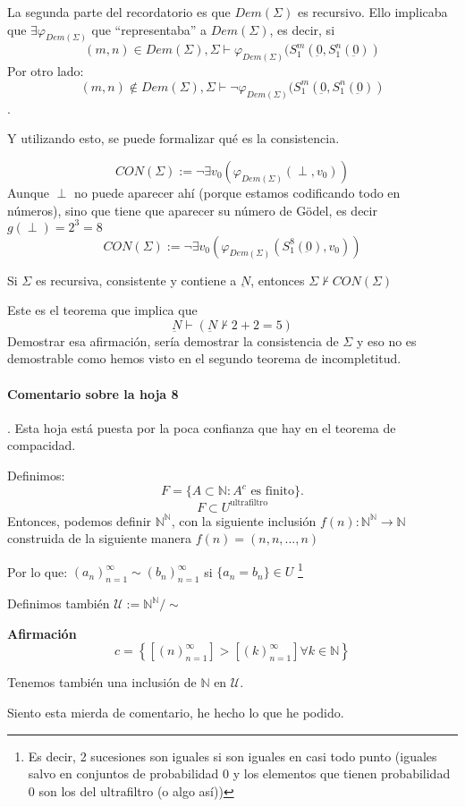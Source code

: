 La segunda parte del recordatorio es que $Dem(Σ)$ es recursivo. Ello implicaba que $\exists φ_{Dem(Σ)}$ que ``representaba'' a $Dem(Σ)$, es decir, si $$(m,n) \in Dem(Σ), Σ\vdash φ_{Dem(Σ)}(S_1^m(\underbar{0},S_1^n(\underbar{0}))$$
Por otro lado: $$(m,n) \not \in Dem(Σ), Σ\vdash \neg φ_{Dem(Σ)}(S_1^m(\underbar{0},S_1^n(\underbar{0}))$$.

Y utilizando esto, se puede formalizar qué es la consistencia.

\begin{defn}
\[CON(Σ) := \neg ∃ v_0 \left( φ_{Dem(Σ)}(\perp,v_0) \right)\]
Aunque $\perp$ no puede aparecer ahí (porque estamos codificando todo en números), sino que tiene que aparecer su número de Gödel, es decir $g(\perp) = 2^3 = 8$
\[CON(Σ) := \neg ∃ v_0 \left( φ_{Dem(Σ)}(S_1^8(\underbar{0}),v_0) \right)\]
\end{defn}

\begin{theorem}
Si $Σ$ es recursiva, consistente y contiene a $\underbar{N}$, entonces $Σ\not\vdash CON(Σ)$
\end{theorem}

Este es el teorema que implica que \[\underbar{N} \vdash \left( \underbar{N} \not \vdash 2+2=5 \right)\]
Demostrar esa afirmación, sería demostrar la consistencia de $Σ$ y eso no es demostrable como hemos visto en el segundo teorema de incompletitud.


\paragraph{Comentario sobre la hoja 8}. Esta hoja está puesta por la poca confianza que hay en el teorema de compacidad.

Definimos:
\[F = \{A\subset ℕ : A^c \text{ es finito}\}.\]
\[F\subset U^{\text{ultrafiltro}}\]
Entonces, podemos definir $ℕ^ℕ$, con la siguiente inclusión $f(n) : ℕ^ℕ \to ℕ$ construida de la siguiente manera $f(n) = (n,n, ... ,n)$

Por lo que: $(a_n)_{n=1}^{∞} \sim (b_n)_{n=1}^{∞}$ si $\{a_n = b_n\} \in U$ \footnote{Es decir, 2 sucesiones son iguales si son iguales en casi todo punto (iguales salvo en conjuntos de probabilidad 0 y los elementos que tienen probabilidad 0 son los del ultrafiltro (o algo así))}

Definimos también $\mathcal{U} := ℕ^ℕ / \sim$

\textbf{Afirmación} \[c = \left\{\left[ (n)_{n=1}^{∞} \right] > \left[ (k)_{n=1}^{∞} \right] ∀k∈ℕ\right\}\]

Tenemos también una inclusión de $ℕ$ en $\mathcal{U}$.

Siento esta mierda de comentario, he hecho lo que he podido.
